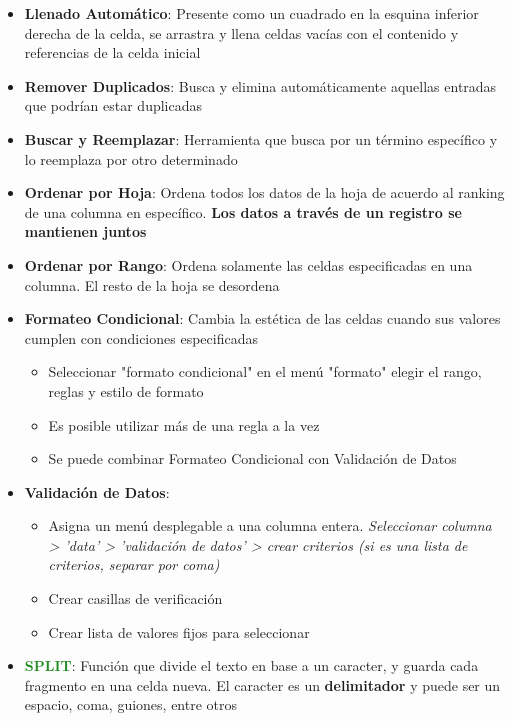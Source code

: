 \begin{itemize}
    \item {\textbf{Llenado Automático}: Presente como un cuadrado en la esquina inferior derecha de la celda, se arrastra y llena celdas vacías con el contenido y referencias de la celda inicial}
    \item {\textbf{Remover Duplicados}: Busca y elimina automáticamente aquellas entradas que podrían estar duplicadas} 
    \item {\textbf{Buscar y Reemplazar}: Herramienta que busca por un término específico y lo reemplaza por otro determinado}
    \item {\textbf{Ordenar por Hoja}: Ordena todos los datos de la hoja de acuerdo al ranking de una columna en específico. \textbf{Los datos a través de un registro se mantienen juntos}}
    \item {\textbf{Ordenar por Rango}: Ordena solamente las celdas especificadas en una columna. El resto de la hoja se desordena}
    \item {\textbf{Formateo Condicional}: Cambia la estética de las celdas cuando sus valores cumplen con condiciones especificadas
        \begin{itemize}
            \item {Seleccionar "formato condicional" en el menú "formato"  elegir el rango, reglas y estilo de formato}
            \item {Es posible utilizar más de una regla a la vez}
            \item {Se puede combinar Formateo Condicional con Validación de Datos}
        \end{itemize}}
    \item {\textbf{Validación de Datos}: 
    \begin{itemize}
        \item {Asigna un menú desplegable a una columna entera. \textit{Seleccionar columna > 'data' > 'validación de datos' > crear criterios (si es una lista de criterios, separar por coma)}}
        \item {Crear casillas de verificación}
        \item {Crear lista de valores fijos para seleccionar}   
    \end{itemize}} 
    \item {\textcolor{ForestGreen}{\textbf{SPLIT}}: Función que divide el texto en base a un caracter, y guarda cada fragmento en una celda nueva. El caracter es un \textbf{delimitador} y puede ser un espacio, coma, guiones, entre otros}

\end{itemize}
